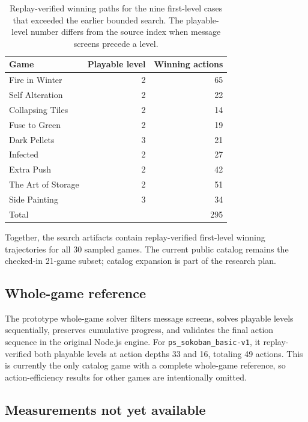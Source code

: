 \documentclass[a4paper,11pt]{article}
\begin{document}
\begin{table}[t]
  \centering
  \small
  \begin{tabular}{lrr}
    \toprule
    Game & Playable level & Winning actions \\
    \midrule
    Fire in Winter      & 2 & 65 \\
    Self Alteration     & 2 & 22 \\
    Collapsing Tiles    & 2 & 14 \\
    Fuse to Green       & 2 & 19 \\
    Dark Pellets        & 3 & 21 \\
    Infected            & 2 & 27 \\
    Extra Push          & 2 & 42 \\
    The Art of Storage  & 2 & 51 \\
    Side Painting       & 3 & 34 \\
    \midrule
    Total               &   & 295 \\
    \bottomrule
  \end{tabular}
  \caption{Replay-verified winning paths for the nine first-level cases that
  exceeded the earlier bounded search. The playable-level number differs from
  the source index when message screens precede a level.}
  \label{tab:targeted}
\end{table}

Together, the search artifacts contain replay-verified first-level winning
trajectories for all 30 sampled games. The current public catalog remains the
checked-in 21-game subset; catalog expansion is part of the research plan.

\subsection{Whole-game reference}

The prototype whole-game solver filters message screens, solves playable levels
sequentially, preserves cumulative progress, and validates the final action
sequence in the original Node.js engine. For
\texttt{ps\_sokoban\_basic-v1}, it replay-verified both playable levels at
action depths 33 and 16, totaling 49 actions. This is currently the only catalog
game with a complete whole-game reference, so action-efficiency results for
other games are intentionally omitted.

\subsection{Measurements not yet available}
\end{document}
